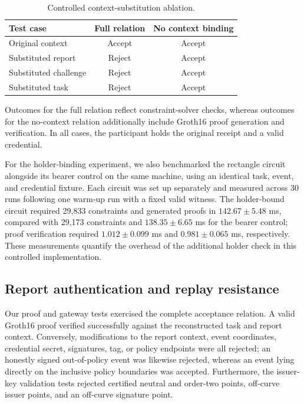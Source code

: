\documentclass[pdflatex,iicol,sn-mathphys-num]{sn-jnl}
\begin{document}
\begin{table}[t]
\centering\footnotesize\setlength{\tabcolsep}{3pt}\caption{Controlled context-substitution ablation.}\label{tab:context-ablation}
\begin{tabular}{@{}lcc@{}}\toprule
Test case & Full relation & No context binding \\\midrule
Original context & Accept & Accept \\
Substituted report & Reject & Accept \\
Substituted challenge & Reject & Accept \\
Substituted task & Reject & Accept \\\bottomrule
\end{tabular}\par\vspace{2pt}
\footnotesize Outcomes for the full relation reflect constraint-solver checks, whereas outcomes for the no-context relation additionally include Groth16 proof generation and verification. In all cases, the participant holds the original receipt and a valid credential.
\end{table}

For the holder-binding experiment, we also benchmarked the rectangle circuit alongside its bearer control on the same machine, using an identical task, event, and credential fixture. Each circuit was set up separately and measured across 30 runs following one warm-up run with a fixed valid witness. The holder-bound circuit required 29,833 constraints and generated proofs in $142.67\pm5.48$ ms, compared with 29,173 constraints and $138.35\pm6.65$ ms for the bearer control; proof verification required $1.012\pm0.099$ ms and $0.981\pm0.065$ ms, respectively. These measurements quantify the overhead of the additional holder check in this controlled implementation.

\subsection{Report authentication and replay resistance}
Our proof and gateway tests exercised the complete acceptance relation. A valid Groth16 proof verified successfully against the reconstructed task and report context. Conversely, modifications to the report context, event coordinates, credential secret, signatures, tag, or policy endpoints were all rejected; an honestly signed out-of-policy event was likewise rejected, whereas an event lying directly on the inclusive policy boundaries was accepted. Furthermore, the issuer-key validation tests rejected certified neutral and order-two points, off-curve issuer points, and an off-curve signature point.
\end{document}
